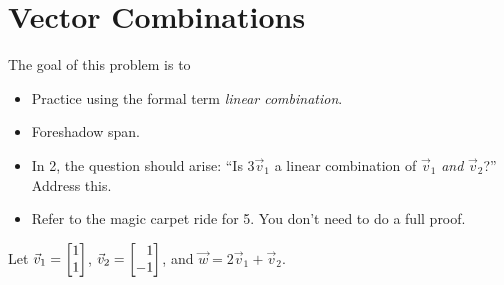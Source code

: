 	\begin{bookonly}\begin{center}\hspace{-2cm}\triplegrid\hspace{-2cm}\triplegrid\end{center}\end{bookonly}
	\bookonlynewpage
\section*{Vector Combinations}
	\vspace{-1em}


	\question
	\label{ProbSkewBasis}
	\begin{annotation}
		\begin{goals}

			The goal of this problem is to
			\begin{itemize}
				\item Practice using the formal term \emph{linear combination}.
				\item Foreshadow span.
			\end{itemize}
		\end{goals}

		\begin{notes}
			\begin{itemize}
				\item In 2, the question should arise: ``Is $3\vec v_1$
					a linear combination of $\vec v_1$ \emph{and}
					$\vec v_2$?'' Address this.
				\item Refer to the magic carpet ride for 5. You don't
					need to do a full proof.
			\end{itemize}
		\end{notes}
	\end{annotation}
	Let $\vec v_1=\mat{1\\1}$, $\vec v_2=\mat{1\\-1}$, and $\vec w=2\vec v_1+\vec v_2$.
